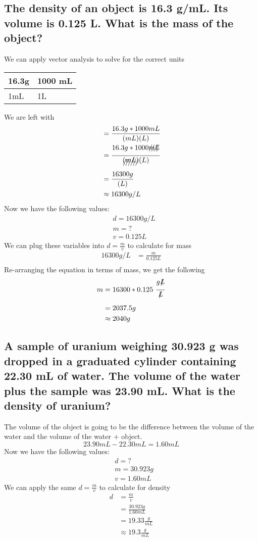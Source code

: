 \documentclass[11pt]{article}
\begin{document}
\subsection{The density of an object is 16.3 g/mL. Its volume is 0.125 L. What is the mass of the object?}
\label{sec:org073801c}
We can apply vector analysis to solve for the correct units
\begin{center}
\begin{tabular}{ll}
16.3g & 1000 mL\\
\hline
1mL & 1L\\
\end{tabular}
\end{center}
We are left with
\begin{align*}
&= \frac{16.3g * 1000mL}{(mL)(L)}\\
&= \frac{16.3g * 1000\xout{mL}}{\xout{(mL)}(L)}\\
&= \frac{16300g}{(L)}\\
&\approx 16300g/L
\end{align*}
Now we have the following values:
\begin{align*}
&d = 16300g/L\\
&m = ?\\
&v = 0.125L
\end{align*}
We can plug these variables into \(d=\frac{m}{v}\) to calculate for mass
\begin{align*}
16300{g}/{L} &=\frac{m}{0.125L}\\
\end{align*}
Re-arranging the equation in terms of mass, we get the following
\begin{align*}
m &= 16300 * 0.125\ \frac{g\xout{L}}{\xout{L}}\\
&= 2037.5g\\
&\approx 2040g
\end{align*}

\subsection{A sample of uranium weighing 30.923 g was dropped in a graduated cylinder containing 22.30 mL of water. The volume of the water plus the sample was 23.90 mL. What is the density of uranium?}
\label{sec:org077e16d}
The volume of the object is going to be the difference between the volume of the water and the volume of the water + object.
\begin{equation}
23.90mL - 22.30mL = 1.60mL
\end{equation}
Now we have the following values:
\begin{align*}
&d = ?\\
&m = 30.923g\\
&v = 1.60mL
\end{align*}
We can apply the same \(d=\frac{m}{v}\) to calculate for density
\begin{align*}
d&=\frac{m}{v} \\
            &=\frac{30.923g}{1.60mL}\\
            &=19.33\frac{g}{mL}\\
            &\approx19.3\frac{g}{mL}
\end{align*}
\end{document}
